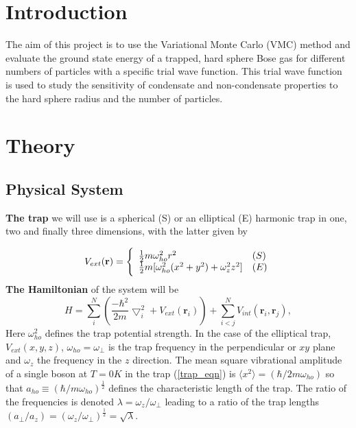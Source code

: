\documentclass[a4paper, 11pt]{article}
\begin{document}
\begin{multicols}{2}    
\nocite{DuBois-phys-rev, Nilsen-phys-rev, mhj-compphys-II}
\section{Introduction}
The aim of this project is to use the Variational Monte Carlo
(VMC) method and evaluate the ground state energy of a trapped, hard
sphere Bose gas for different numbers of particles with a specific
trial wave function. This trial wave function is used to study the sensitivity of
condensate and non-condensate properties to the hard sphere radius
and the number of particles.  

\section{Theory}
\subsection{Physical System}
\textbf{The trap} we will use is a spherical (S)
or an elliptical (E) harmonic trap in one, two and finally three
dimensions, with the latter given by

\begin{equation}
    V_{ext}(\mathbf{r}) = 
    \Bigg\{
        \begin{array}{ll}
            \frac{1}{2}m\omega_{ho}^2r^2 & (S)\\
            \strut
            \frac{1}{2}m[\omega_{ho}^2(x^2+y^2) + \omega_z^2z^2] & (E)
            \label{trap_eqn}
        \end{array}
\end{equation}
\textbf{The Hamiltonian} of the system will be
\begin{equation}
    H = \sum_i^N \left(\frac{-\hbar^2}{2m}{\bigtriangledown }_{i}^2 +V_{ext}({\mathbf{r}}_i)\right)  +
     \sum_{i<j}^{N}
     V_{int}({\mathbf{r}}_i,{\mathbf{r}}_j),\label{eq:Hamiltonian}
\end{equation}
Here $\omega_{ho}^2$ defines the trap potential strength.  In the case of the
elliptical trap, $V_{ext}(x,y,z)$, $\omega_{ho}=\omega_{\perp}$ is the trap
frequency in the perpendicular or $xy$ plane and $\omega_z$ the frequency in
the $z$ direction.  The mean square vibrational amplitude of a single boson at
$T=0K$ in the trap (\ref{trap_eqn}) is $\langle
x^2\rangle=(\hbar/2m\omega_{ho})$ so that $a_{ho} \equiv
(\hbar/m\omega_{ho})^{\frac{1}{2}}$ defines the characteristic length of the
trap.  The ratio of the frequencies is denoted
$\lambda=\omega_z/\omega_{\perp}$ leading to a ratio of the trap lengths
$(a_{\perp}/a_z)=(\omega_z/\omega_{\perp})^{\frac{1}{2}} = \sqrt{\lambda}$.


\end{multicols}
\end{document}
